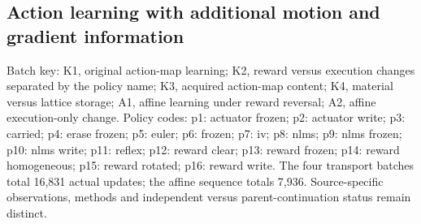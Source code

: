 \subsection*{Action learning with additional motion and gradient information}
Batch key: K1, original action-map learning; K2, reward versus execution changes separated by the policy name; K3, acquired action-map content; K4, material versus lattice storage; A1, affine learning under reward reversal; A2, affine execution-only change. Policy codes: p1: actuator frozen; p2: actuator write; p3: carried; p4: erase frozen; p5: euler; p6: frozen; p7: iv; p8: nlms; p9: nlms frozen; p10: nlms write; p11: reflex; p12: reward clear; p13: reward frozen; p14: reward homogeneous; p15: reward rotated; p16: reward write. The four transport batches total 16,831 actual updates; the affine sequence totals 7,936. Source-specific observations, methods and independent versus parent-continuation status remain distinct.
\begingroup\scriptsize\setlength{\tabcolsep}{3pt}\setlength{\LTpre}{6pt}\setlength{\LTpost}{6pt}
